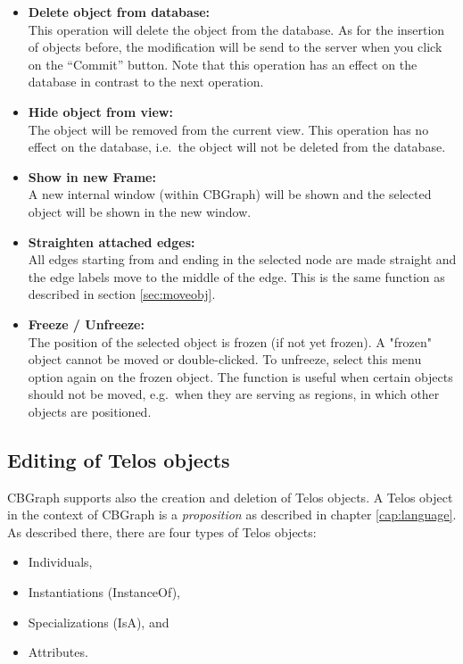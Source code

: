 \begin{itemize}
    Note, that these modifications are not performed directly on the
    database. The editor will collect all modifications and
    send them to the CBserver when you click on the ``Commit''
    button. See section \ref{sec:graph_edit} for more details.
\item {\bf Delete object from database:} \\
    This operation will delete the object from the database. As for the
    insertion of objects before, the modification will be send to
    the server when you click on the ``Commit''
    button. Note that this operation has an effect on the database
    in contrast to the next operation.
\item {\bf Hide object from view:} \\
    The object will be removed from the current view. This operation
    has no effect on the database, i.e.\ the object will not be deleted
    from the database.
\item {\bf Show in new Frame:}\\
    A new internal window (within CBGraph) will be shown
    and the selected object will be shown in the new window.
\item {\bf Straighten attached edges:}\\
    All edges starting from and ending in the selected node are made straight and the edge labels move to the middle
    of the edge. This is the same function as described in section \ref{sec:moveobj}.
\item {\bf Freeze / Unfreeze:}\\
    The position of the selected object is frozen (if not yet frozen). A "frozen" object cannot be moved or double-clicked.
    To unfreeze, select this menu option again on the frozen object. The function is useful when certain objects should not be moved,
    e.g.\ when they are serving as regions, in which other objects are positioned.
\end{itemize}


\subsection{Editing of Telos objects}
\label{sec:graph_edit}

CBGraph supports also the creation and deletion of Telos
objects. A Telos object in the context of CBGraph
is a {\em proposition} as described in chapter \ref{cap:language}.
As described there, there are four types of Telos objects:

\begin{itemize}
\item Individuals,
\item Instantiations (InstanceOf),
\item Specializations (IsA), and
\item Attributes.
\end{itemize}

